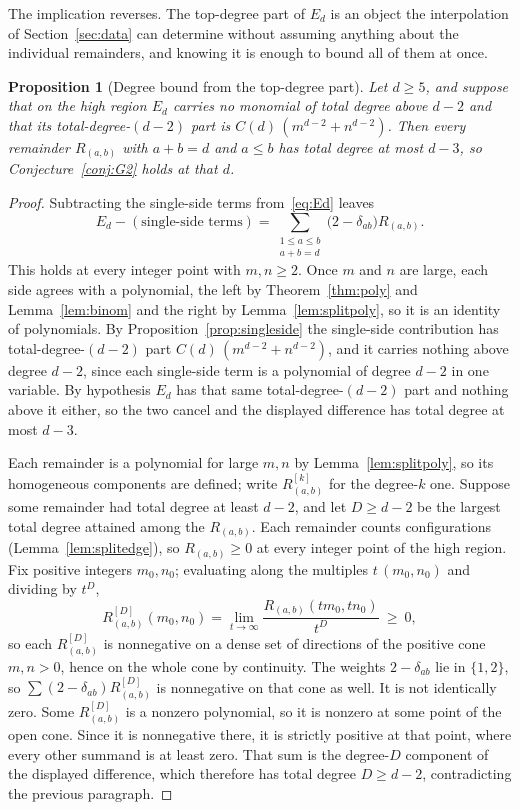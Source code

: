 \documentclass[11pt]{article}
\newtheorem{proposition}[theorem]{Proposition}
\theoremstyle{definition}
\theoremstyle{remark}
\begin{document}
The implication reverses. The top-degree part of $E_d$ is an object the
interpolation of Section~\ref{sec:data} can determine without assuming anything
about the individual remainders, and knowing it is enough to bound all of them at once.

\begin{proposition}[Degree bound from the top-degree part]\label{prop:converse}
Let $d\ge5$, and suppose that on the high region $E_d$ carries no monomial of
total degree above $d-2$ and that its total-degree-$(d-2)$ part is
$C(d)\,(m^{d-2}+n^{d-2})$. Then every remainder $R_{(a,b)}$ with $a+b=d$ and
$a\le b$ has total degree at most $d-3$, so Conjecture~\ref{conj:G2} holds at
that $d$.
\end{proposition}

\begin{proof}
Subtracting the single-side terms from~\eqref{eq:Ed} leaves
\[
  E_d-(\text{single-side terms})
  =\sum_{\substack{1\le a\le b\\ a+b=d}}\bigl(2-\delta_{ab}\bigr)R_{(a,b)}.
\]
This holds at every integer point with $m,n\ge2$. Once $m$ and $n$ are large, each side
agrees with a polynomial, the left by Theorem~\ref{thm:poly} and Lemma~\ref{lem:binom}
and the right by Lemma~\ref{lem:splitpoly}, so it is an identity of polynomials.
By Proposition~\ref{prop:singleside} the single-side contribution has
total-degree-$(d-2)$ part $C(d)\,(m^{d-2}+n^{d-2})$, and it carries nothing above
degree $d-2$, since each single-side term is a polynomial of degree $d-2$ in one
variable. By hypothesis $E_d$ has that same total-degree-$(d-2)$ part and nothing
above it either, so the two cancel and the displayed difference has total degree
at most $d-3$.

\medskip\noindent
Each remainder is a polynomial for large $m,n$ by Lemma~\ref{lem:splitpoly}, so
its homogeneous components are defined; write $R^{[k]}_{(a,b)}$ for the degree-$k$ one.
Suppose some remainder had total degree at least $d-2$, and let $D\ge d-2$ be the
largest total degree attained among the $R_{(a,b)}$. Each remainder counts
configurations (Lemma~\ref{lem:splitedge}), so $R_{(a,b)}\ge0$ at every integer
point of the high region. Fix positive integers $m_0,n_0$;
evaluating along the multiples $t\,(m_0,n_0)$ and dividing by $t^{D}$,
\[
  R^{[D]}_{(a,b)}(m_0,n_0)
  =\lim_{t\to\infty}\frac{R_{(a,b)}(t m_0,t n_0)}{t^{D}}\ \ge\ 0 ,
\]
so each $R^{[D]}_{(a,b)}$ is nonnegative on a dense set of directions of the
positive cone $m,n>0$, hence on the whole cone by continuity. The weights $2-\delta_{ab}$
lie in $\{1,2\}$, so $\sum(2-\delta_{ab})R^{[D]}_{(a,b)}$ is nonnegative on that
cone as well. It is not identically zero. Some $R^{[D]}_{(a,b)}$ is a nonzero
polynomial, so it is nonzero at some point of the open cone. Since it is nonnegative
there, it is strictly positive at that point, where every other summand is at least
zero. That sum is the degree-$D$ component of the displayed difference, which
therefore has total degree $D\ge d-2$, contradicting the previous paragraph.
\end{proof}
\end{document}
